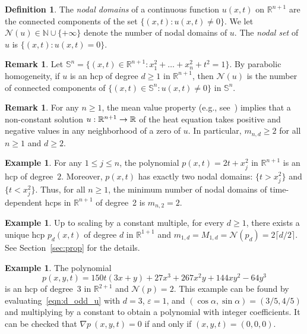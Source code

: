 \documentclass[10pt]{amsart}
\theoremstyle{definition}\newtheorem{defi}[theo]{Definition}\newtheorem{rema}[theo]{Remark}\newtheorem{exam}[theo]{Example}\newtheorem{exem}[theo]{Example}\newtheorem{nota}[theo]{Notation}
\newcommand{\N}{\mathbb{N}}
\newcommand{\R}{\mathbb{R}}
\newcommand{\sphere}{\mathbb{S}}
\newcommand{\nodal}{\mathcal{N}}
\renewcommand{\epsilon}{\varepsilon}
\renewcommand*{\to}{\mathchoice{\longrightarrow}{\rightarrow}{\rightarrow}{\rightarrow}}
\begin{document}
\begin{defi}
The \emph{nodal domains} of a continuous function $u(x,t)$ on $\R^{n+1}$ are the connected components of the set $\{(x,t) : u(x,t) \ne 0\}$. We let $\nodal(u) \in \N \cup \{+\infty\}$ denote the number of nodal domains of $u$. The \emph{nodal set} of $u$ is $\{(x,t):u(x,t)=0\}$.
\end{defi}

\begin{rema}\label{r:sphere}
Let $\sphere^n=\{(x,t)\in\R^{n+1}:x_1^2+\dots+x_n^2+t^2=1\}$. By parabolic homogeneity, if $u$ is an hcp of degree $d\geq 1$ in $\R^{n+1}$, then $\nodal(u)$ is the number of connected components of $\{(x,t)\in\sphere^n:u(x,t)\neq 0\}$ in $\sphere^n$.
\end{rema}

\begin{rema}\label{r:meanvalue}
For any $n\geq 1$, the mean value property (e.g., see~\cite[p.~50]{Evans-PDE}) implies that a non-constant solution $u:\R^{n+1}\to \R$ of the heat equation takes positive and negative values in any neighborhood of a zero of $u$. In particular, $m_{n,d}\geq 2$ for all $n\geq 1$ and $d\geq 2$.
\end{rema}

\begin{exam}\label{eq:deg_2}
For any $1\leq j\leq n$, the polynomial $p(x,t) = 2t + x_j^2$ in $\R^{n+1}$ is an hcp of degree~$2$. Moreover, $p(x,t)$ has exactly two nodal domains: $\{ t > x_j^2\}$ and $\{t < x_j^2 \}$. Thus, for all $n\geq 1$, the minimum number of nodal domains of time-dependent hcps in $\R^{n+1}$ of degree~2 is $m_{n,2}=2$.
\end{exam}

\begin{exam}\label{eq:1d}
Up to scaling by a constant multiple, for every $d\geq 1$, there exists a unique hcp $p_d(x,t)$ of degree $d$ in $\R^{1+1}$ and $m_{1,d}=M_{1,d}=\nodal(p_d)=2\lceil d/2\rceil$. See Section~\ref{sec:prop} for the details.
\end{exam}

\begin{exam}\label{eq:n2d3}
The polynomial
\begin{equation}
p(x,y,t)=150t(3x+y)+27x^3+267x^2y+144xy^2-64y^3
\end{equation}
is an hcp of degree~3 in $\R^{2+1}$ and $\nodal(p)=2$. This example can be found by evaluating~\eqref{eqn:d_odd_u} with $d=3$, $\epsilon=1$, and $(\cos\alpha,\sin\alpha)=(3/5,4/5)$ and multiplying by a constant to obtain a polynomial with integer coefficients. It can be checked that $\nabla p~(x,y,t)=0$ if and only if $(x,y,t)=(0,0,0)$.
\end{exam}
\end{document}
